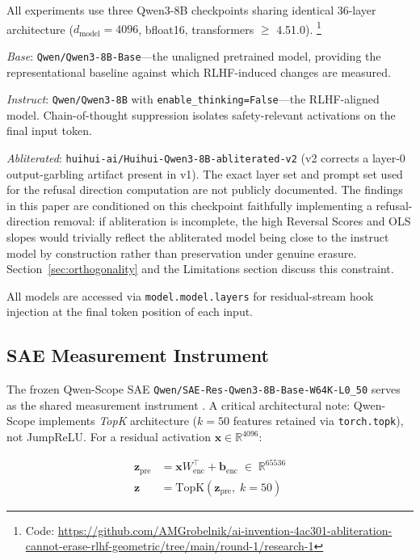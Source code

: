 \documentclass[11pt,letterpaper]{article}
\begin{document}
All experiments use three Qwen3-8B checkpoints sharing identical 36-layer architecture
($d_{\text{model}} = 4096$, bfloat16, transformers $\geq$ 4.51.0).%
\footnote{Code: \url{https://github.com/AMGrobelnik/ai-invention-4ac301-abliteration-cannot-erase-rlhf-geometric/tree/main/round-1/research-1}}

\noindent\emph{Base}: \texttt{Qwen/Qwen3-8B-Base}---the unaligned pretrained model, providing the
representational baseline against which RLHF-induced changes are measured.

\noindent\emph{Instruct}: \texttt{Qwen/Qwen3-8B} with \texttt{enable\_thinking=False}---the
RLHF-aligned model. Chain-of-thought suppression isolates safety-relevant activations on the final
input token.

\noindent\emph{Abliterated}: \texttt{huihui-ai/Huihui-Qwen3-8B-abliterated-v2} (v2 corrects a
layer-0 output-garbling artifact present in v1). The exact layer set and prompt set used for the
refusal direction computation are not publicly documented. The findings in this paper are conditioned
on this checkpoint faithfully implementing a refusal-direction removal: if abliteration is incomplete,
the high Reversal Scores and OLS slopes would trivially reflect the abliterated model being close to
the instruct model by construction rather than preservation under genuine erasure.
Section~\ref{sec:orthogonality} and the Limitations section discuss this constraint.

All models are accessed via \texttt{model.model.layers} for residual-stream hook injection at the
final token position of each input.

\subsection{SAE Measurement Instrument}
\label{sec:sae}

The frozen Qwen-Scope SAE \texttt{Qwen/SAE-Res-Qwen3-8B-Base-W64K-L0\_50} serves as the shared
measurement instrument \citep{Deng2026}. A critical architectural note: Qwen-Scope implements
\emph{TopK} architecture ($k = 50$ features retained via \texttt{torch.topk}), not JumpReLU. For a
residual activation $\mathbf{x} \in \mathbb{R}^{4096}$:

\begin{align}
  \mathbf{z}_{\text{pre}} &= \mathbf{x}W_{\text{enc}}^\top + \mathbf{b}_{\text{enc}}
    \;\in\; \mathbb{R}^{65536} \\
  \mathbf{z} &= \text{TopK}(\mathbf{z}_{\text{pre}},\; k{=}50)
\end{align}
\end{document}
